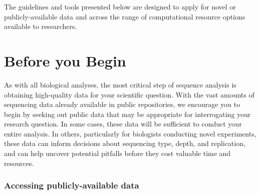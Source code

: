 \documentclass[10pt,letterpaper]{article}
\begin{document}

The guidelines and tools presented below are designed to apply for novel or publicly-available data and across the range of computational resource options available to researchers.

\section*{Before you Begin}

As with all biological analyses, the most critical step of sequence analysis is obtaining high-quality data for your scientific question. With the vast amounts of sequencing data already available in public repositories, we encourage you to begin by seeking out public data that may be appropriate for interrogating your research question. In some cases, these data will be sufficient to conduct your entire analysis. In others, particularly for biologists conducting novel experiments, these data can inform decisions about sequencing type, depth, and replication, and can help uncover potential pitfalls before they cost valuable time and resources.

\subsubsection*{Accessing publicly-available data}
\end{document}
